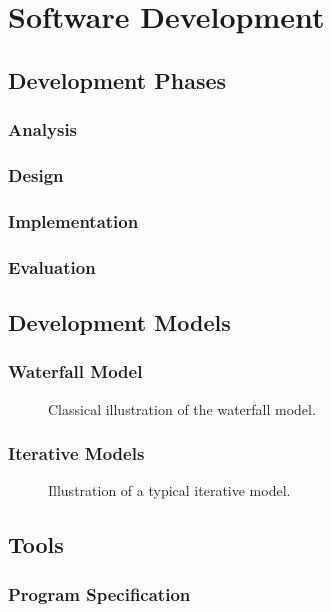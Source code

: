\chapter{Software Development}

\section{Development Phases}
\subsection{Analysis}
\subsection{Design}
\subsection{Implementation}
\subsection{Evaluation}

\section{Development Models}
\subsection{Waterfall Model}

\begin{figure}[tbp]
  
  \caption{Classical illustration of the waterfall model.}
  \label{fig:swdev:waterfall}
\end{figure}

\subsection{Iterative Models}


\begin{figure}[tbp]
  
  \caption{Illustration of a typical iterative model.}
  \label{fig:swdev:waterfall}
\end{figure}

\section{Tools}
\subsection{Program Specification}
